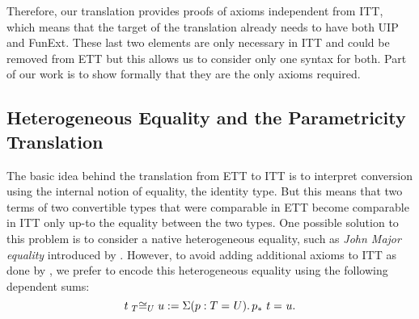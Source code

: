 Therefore, our translation provides proofs of axioms independent from
ITT, which means that the target of the translation already needs to
have both UIP and FunExt.
These last two elements are only necessary in ITT and could be removed from ETT
but this allows us to consider only one syntax for both.
%
Part of our work is to show formally that they are the only axioms
required.

\subsection{Heterogeneous Equality and the Parametricity Translation}
\label{sec:heteq}

The basic idea behind the translation from ETT to ITT is to interpret
conversion using the internal notion of equality, \ie the identity type.
%
But this means that two terms of two convertible types that were comparable
in ETT become comparable in ITT only up-to the equality between the
two types. One possible solution to this problem is to consider a
native heterogeneous equality, such as \emph{John Major
equality} introduced by \cite{mcbride2000dependently}.
%
However, to avoid adding additional axioms to ITT as done by
\cite{oury2005extensionality}, we prefer to encode this
heterogeneous equality using the following dependent sums:
$$\Heq{T}{t}{U}{u} := \Sum{p:\Eq{}{T}{U}} \Eq{}{\transpo{p}\ t}{u}.$$
%

